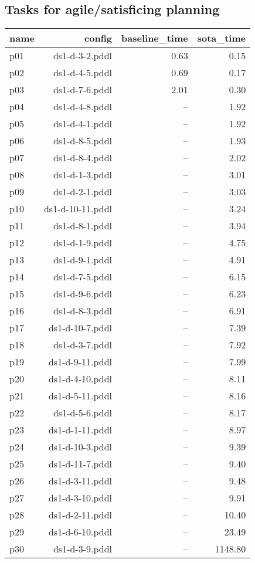 \documentclass{article}
\begin{document}
                    \subsection*{Tasks for agile/satisficing planning}
                    
                            \begin{center}
                            \scriptsize
                            \begin{tabular}{@{}l|r|r|r@{}}
                            name & config & baseline\_time & sota\_time\\\midrule
                              p01& ds1-d-3-2.pddl&0.63&0.15\\
  p02& ds1-d-4-5.pddl&0.69&0.17\\
  p03& ds1-d-7-6.pddl&2.01&0.30\\
  p04& ds1-d-4-8.pddl&--&1.92\\
  p05& ds1-d-4-1.pddl&--&1.92\\
  p06& ds1-d-8-5.pddl&--&1.93\\
  p07& ds1-d-8-4.pddl&--&2.02\\
  p08& ds1-d-1-3.pddl&--&3.01\\
  p09& ds1-d-2-1.pddl&--&3.03\\
  p10& ds1-d-10-11.pddl&--&3.24\\
  p11& ds1-d-8-1.pddl&--&3.94\\
  p12& ds1-d-1-9.pddl&--&4.75\\
  p13& ds1-d-9-1.pddl&--&4.91\\
  p14& ds1-d-7-5.pddl&--&6.15\\
  p15& ds1-d-9-6.pddl&--&6.23\\
  p16& ds1-d-8-3.pddl&--&6.91\\
  p17& ds1-d-10-7.pddl&--&7.39\\
  p18& ds1-d-3-7.pddl&--&7.92\\
  p19& ds1-d-9-11.pddl&--&7.99\\
  p20& ds1-d-4-10.pddl&--&8.11\\
  p21& ds1-d-5-11.pddl&--&8.16\\
  p22& ds1-d-5-6.pddl&--&8.17\\
  p23& ds1-d-1-11.pddl&--&8.97\\
  p24& ds1-d-10-3.pddl&--&9.39\\
  p25& ds1-d-11-7.pddl&--&9.40\\
  p26& ds1-d-3-11.pddl&--&9.48\\
  p27& ds1-d-3-10.pddl&--&9.91\\
  p28& ds1-d-2-11.pddl&--&10.40\\
  p29& ds1-d-6-10.pddl&--&23.49\\
  p30& ds1-d-3-9.pddl&--&1148.80
                            \end{tabular}
                            \end{center}
                    
\end{document}
